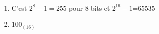 \begin{Soln}{6}
	~\\ \vspace{-7mm}
	\begin{multicols}{2}
		\begin{enumerate}
			\item C'est $2^{8}-1=255$ pour 8 bits et $2^16-1$=65535
			\item 100$_{(16)}$
		\end{enumerate}
	\end{multicols}
\end{Soln}
